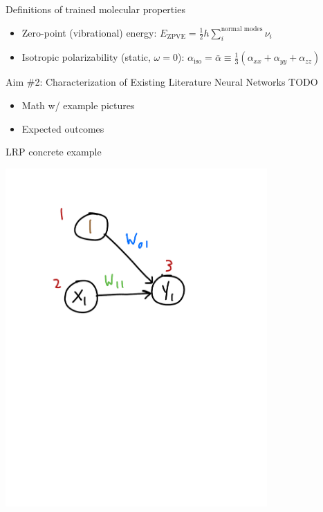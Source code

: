 \documentclass[xetex,compress]{beamer}
\begin{document}
\begin{frame}{Definitions of trained molecular properties}
  \begin{itemize}
  \item Zero-point (vibrational) energy: \(E_{\text{ZPVE}} = \frac{1}{2} h \sum_{i}^{\text{normal modes}} \nu_{i}\)
  \item Isotropic polarizability (static, \(\omega = 0\)): \(\alpha_{\text{iso}} = \bar{\alpha} \equiv \frac{1}{3} (\alpha_{xx} + \alpha_{yy} + \alpha_{zz})\)
  \end{itemize}
\end{frame}


\begin{frame}{Aim \#2: Characterization of Existing Literature Neural Networks}
  TODO
  \begin{itemize}
  \item Math w/ example pictures
  \item Expected outcomes
  \end{itemize}
\end{frame}

\begin{frame}{LRP concrete example}
  \begin{center}
    \includegraphics[width=0.75\textwidth]{./figures/lr_nn_4.pdf}
  \end{center}
\end{frame}
\end{document}
